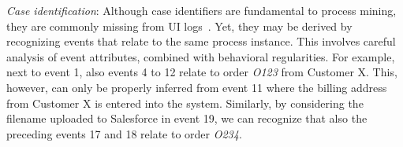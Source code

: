 \vspace{0.2em}
\newline
\textit{Case identification}: Although case identifiers are fundamental to process mining, they are commonly missing from UI logs~\cite{leno2021robotic}. Yet, they may be derived by recognizing events that relate to the same process instance. This involves careful analysis of event attributes, combined with behavioral regularities.
For example, next to event 1, also events 4 to 12 relate to order \textit{O123} from Customer X. This, however, can only be properly inferred from event 11 where the billing address from Customer X is entered into the system. Similarly, by considering the filename uploaded to Salesforce in event 19, we can recognize that also the preceding events 17 and 18 relate to order \emph{O234}.



